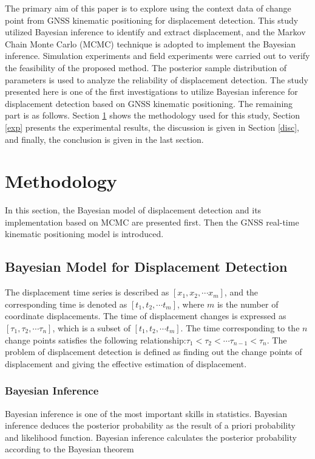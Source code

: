 \documentclass{svjour3}                     %
\begin{document}
The primary aim of this paper is to explore using the context data of change point from GNSS kinematic positioning for displacement detection. This study utilized Bayesian inference to identify and extract displacement, and the Markov Chain Monte Carlo (MCMC) technique is adopted to implement the Bayesian inference. Simulation experiments and field experiments were carried out to verify the feasibility of the proposed method. The posterior sample distribution of parameters is used to analyze the reliability of displacement detection. The study presented here is one of the first investigations to utilize Bayesian inference for displacement detection based on GNSS kinematic positioning. The remaining part is as follows. Section \ref{method} shows the methodology used for this study, Section \ref{exp} presents the experimental results, the discussion is given in Section \ref{disc}, and finally, the conclusion is given in the last section.



\section{Methodology}
\label{method}
In this section, the Bayesian model of displacement detection and its implementation based on MCMC are presented first. Then the GNSS  real-time kinematic positioning model is introduced.
\subsection{Bayesian Model for Displacement Detection}


The displacement time series is described as $\left[ {{x_1},{x_2}, \cdots {x_m}} \right]$,  and the corresponding time is denoted as $\left[ {{t_1},{t_2}, \cdots {t_m}} \right]$, where $m$ is the number of coordinate displacements. The time of displacement changes is expressed as $\left[ {{\tau _1},{\tau _2}, \cdots {\tau _n}} \right]$, which is a subset of $\left[ {{t_1},{t_2}, \cdots {t_m}} \right]$.  
The time corresponding to the $n$ change points satisfies the following relationship:$ {{\tau _1}<{\tau _2}<\cdots {\tau _{n-1}}<{\tau _n}} $.
The problem of displacement detection is defined as finding out the change points of displacement and giving the effective estimation of displacement.

\subsubsection{Bayesian Inference}
Bayesian inference is one of the most important skills in statistics. Bayesian inference deduces the posterior probability as the result of a priori probability and likelihood function. Bayesian inference calculates the posterior probability according to the Bayesian theorem\citep{chen2009modulation,chen2013bayesian}
\end{document}
